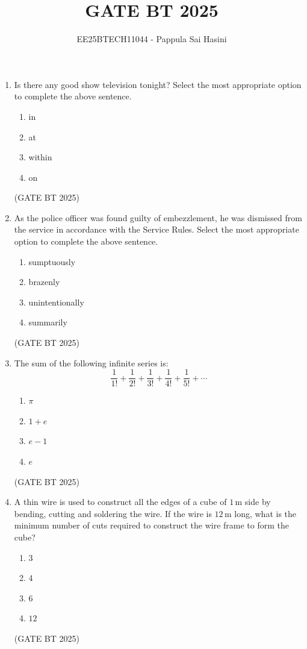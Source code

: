 \documentclass[journal,12pt,onecolumn]{IEEEtran}
\theoremstyle{remark}
\begin{document}
\title{GATE BT 2025}
\author{EE25BTECH11044 - Pappula Sai Hasini}
\maketitle
\renewcommand{\thefigure}{\theenumi}
\renewcommand{\thetable}{\theenumi}

\begin{enumerate}


\item Is there any good show television tonight? Select the most appropriate option to complete the above sentence.
\begin{enumerate}
\item in
\item at
\item within
\item on
\end{enumerate}
\hfill (GATE BT 2025)

\item As the police officer was found guilty of embezzlement, he was dismissed from the service in accordance with the Service Rules. Select the most appropriate option to complete the above sentence.
\begin{enumerate}
\item sumptuously
\item brazenly
\item unintentionally
\item summarily
\end{enumerate}
\hfill (GATE BT 2025)

\item The sum of the following infinite series is:
\[
\frac{1}{1!} + \frac{1}{2!} + \frac{1}{3!} + \frac{1}{4!} + \frac{1}{5!} + \cdots
\]
\begin{enumerate}
\item $\pi$
\item $1 + e$
\item $e - 1$
\item $e$
\end{enumerate}
\hfill (GATE BT 2025)

\item A thin wire is used to construct all the edges of a cube of $1 \, \text{m}$ side by bending, cutting and soldering the wire. If the wire is $12 \, \text{m}$ long, what is the minimum number of cuts required to construct the wire frame to form the cube?
\begin{enumerate}
\item $3$
\item $4$
\item $6$
\item $12$
\end{enumerate}
\hfill (GATE BT 2025)


\end{enumerate}
\end{document}

